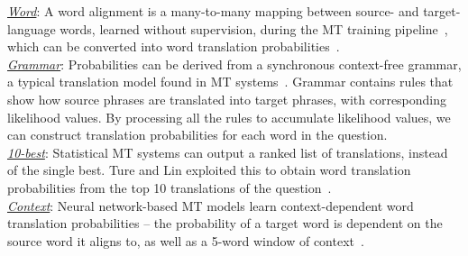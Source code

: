 \documentclass{sig-alternate-05-2015}
\begin{document}
\noindent \underline{\emph{Word}}: A word alignment is a many-to-many mapping between source- and target-language words,
learned without supervision, during the MT training pipeline~\cite{Och:2003a}, which 
can be converted into word translation probabilities~\cite{Darwish:2003aa}.\\
\underline{\emph{Grammar}}: Probabilities can be derived from a synchronous context-free grammar, a typical
translation model found in MT systems~\cite{Ture:2014aa}. Grammar contains rules that show how source phrases
are translated into target phrases, with corresponding likelihood values.
By processing all the rules to accumulate likelihood values, we can construct translation probabilities for each word in the question.\\
\underline{\emph{10-best}}: Statistical MT systems can output a ranked list of translations, instead of the single best. 
Ture and Lin exploited this to obtain word translation probabilities from the top 10 translations of the question~\cite{Ture:2014aa}.\\
\underline{\emph{Context}}: Neural network-based MT models learn context-dependent word translation probabilities -- 
the probability of a target word is dependent on the source word it aligns to, as well as a 5-word window of context~\cite{Devlin:2014}.\\
\end{document}
